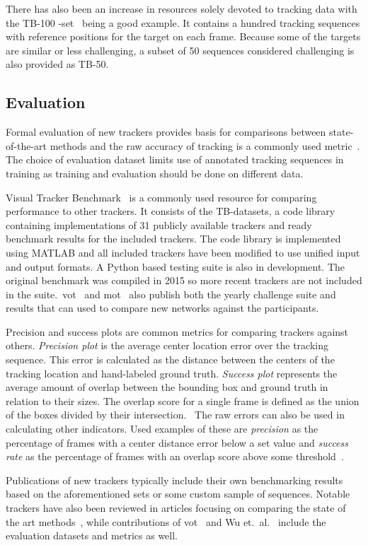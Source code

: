 There has also been an increase in resources solely devoted to tracking data with the TB-100 -set~\cite{VTB} being a good example. It contains a hundred tracking sequences with reference positions for the target on each frame. Because some of the targets are similar or less challenging, a subset of 50 sequences considered challenging is also provided as TB-50.~\cite{OT_BENCH}

\subsection{Evaluation}
Formal evaluation of new trackers provides basis for comparisons between state-of-the-art methods and the raw accuracy of tracking is a commonly used metric~\cite{OT_BENCH}. The choice of evaluation dataset limits use of annotated tracking sequences in training as training and evaluation should be done on different data.

Visual Tracker Benchmark~\cite{VTB} is a commonly used resource for comparing performance to other trackers. It consists of the TB-datasets, a code library containing implementations of 31 publicly available trackers and ready benchmark results for the included trackers. The code library is implemented using MATLAB and all included trackers have been modified to use unified input and output formats. A Python based testing suite is also in development. The original benchmark was compiled in 2015 so more recent trackers are not included in the suite.~\ac{vot}~\cite{VOT} and \ac{mot}~\cite{MOT16} also publish both the yearly challenge suite and results that can used to compare new networks against the participants.

Precision and success plots are common metrics for comparing trackers against others. \textit{Precision plot} is the average center location error over the tracking sequence. This error is calculated as the distance between the centers of the tracking location and hand-labeled ground truth. \textit{Success plot} represents the average amount of overlap between the bounding box and ground truth in relation to their sizes. The overlap score for a single frame is defined as the union of the boxes divided by their intersection.~\cite{OT_BENCH} The raw errors can also be used in calculating other indicators. Used examples of these are \textit{precision} as the percentage of frames with a center distance error below a set value and \textit{success rate} as the percentage of frames with an overlap score above some threshold~\cite{DEEPTRACK}.

Publications of new trackers typically include their own benchmarking results based on the aforementioned sets or some custom sample of sequences. Notable trackers have also been reviewed in articles focusing on comparing the state of the art methods~\cite{OT_BENCH}, while contributions of \ac{vot}~\cite{VOT} and Wu et.~al.~\cite{OT_BENCH} include the evaluation datasets and metrics as well.
